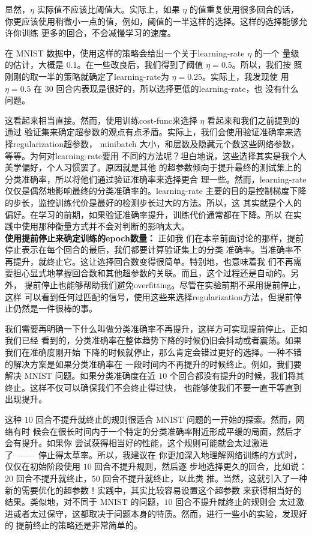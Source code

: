 显然，$\eta$ 实际值不应该比阈值大。实际上，如果 $\eta$ 的值重复使用很多回合的话，
你更应该使用稍微小一点的值，例如，阈值的一半这样的选择。这样的选择能够允许你训练
更多的回合，不会减慢学习的速度。

在 MNIST 数据中，使用这样的策略会给出一个关于\gls*{learning-rate} $\eta$ 的一个
量级的估计，大概是 $0.1$。在一些改良后，我们得到了阈值 $\eta=0.5$。所以，我们按
照刚刚的取一半的策略就确定了\gls*{learning-rate}为 $\eta=0.25$。实际上，我发现使
用 $\eta=0.5$ 在 $30$ 回合内表现是很好的，所以选择更低的\gls*{learning-rate}，也
没有什么问题。

这看起来相当直接。然而，使用训练\gls*{cost-func}来选择 $\eta$ 看起来和我们之前提到的通过
验证集来确定超参数的观点有点矛盾。实际上，我们会使用验证准确率来选择\gls*{regularization}超参数，
minibatch 大小，和层数及隐藏元个数这些网络参数，等等。为何对\gls*{learning-rate}要用
不同的方法呢？坦白地说，这些选择其实是我个人美学偏好，个人习惯罢了。原因就是其他
的超参数倾向于提升最终的测试集上的分类准确率，所以将他们通过验证准确率来选择更合
理一些。然而，\gls*{learning-rate}仅仅是偶然地影响最终的分类准确率的。\gls*{learning-rate}%
主要的目的是控制梯度下降的步长，监控训练代价是最好的检测步长过大的方法。所以，这
其实就是个人的偏好。在学习的前期，如果验证准确率提升，训练代价通常都在下降。所以
在实践中使用那种衡量方式并不会对判断的影响太大。\\

\textbf{使用提前停止\label{early_stopping}来确定训练的\gls*{epoch}数量：} 正如我
们在本章前面讨论的那样，提前停止表示在每个回合的最后，我们都要计算验证集上的分类
准确率。当准确率不再提升，就终止它。这让选择回合数变得很简单。特别地，也意味着我
们不再需要担心显式地掌握回合数和其他超参数的关联。而且，这个过程还是自动的。另外，
提前停止也能够帮助我们避免\gls*{overfitting}。尽管在实验前期不采用提前停止，这样
可以看到任何过匹配的信号，使用这些来选择\gls*{regularization}方法，但提前停止仍然是一件很棒的事。

我们需要再明确一下什么叫做分类准确率不再提升，这样方可实现提前停止。正如我们已经
看到的，分类准确率在整体趋势下降的时候仍旧会抖动或者震荡。如果我们在准确度刚开始
下降的时候就停止，那么肯定会错过更好的选择。一种不错的解决方案是如果分类准确率在
一段时间内不再提升的时候终止。例如，我们要解决 MNIST 问题。如果分类准确度在近
$10$ 个回合都没有提升的时候，我们将其终止。这样不仅可以确保我们不会终止得过快，
也能够使我们不要一直干等直到出现提升。

这种 $10$ 回合不提升就终止的规则很适合 MNIST 问题的一开始的探索。然而，网络有时
候会在很长时间内于一个特定的分类准确率附近形成平缓的局面，然后才会有提升。如果你
尝试获得相当好的性能，这个规则可能就会太过激进了~——~停止得太草率。所以，我建议在
你更加深入地理解网络训练的方式时，仅仅在初始阶段使用 $10$ 回合不提升规则，然后逐
步地选择更久的回合，比如说：$20$ 回合不提升就终止，$50$ 回合不提升就终止，以此类
推。当然，这就引入了一种新的需要优化的超参数！实践中，其实比较容易设置这个超参数
来获得相当好的结果。类似地，对不同于 MNIST 的问题，$10$ 回合不提升就终止的规则会
太过激进或者太过保守，这都取决于问题本身的特质。然而，进行一些小的实验，发现好的
提前终止的策略还是非常简单的。


